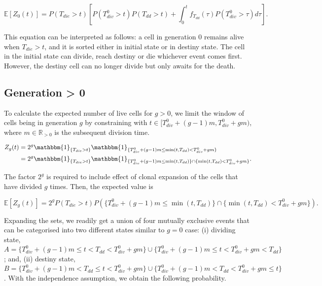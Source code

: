 \documentclass[11pt, a4paper]{article}
\begin{document}
\begin{linenomath*}
    \begin{equation}
        \label{eq:final_gen0}
        \mathbb{E}[Z_0(t)] = P(T_{die} > t)\left[P(T_{div}^0 > t)P(T_{dd} > t)  + \int_0^t f_{T_{dd}}(\tau) P(T_{div}^0 > \tau)d\tau\right].
    \end{equation}
\end{linenomath*}
This equation can be interpreted as follows: a cell in generation 0 remains alive when $T_{die} > t$, and it is sorted either in initial state or in destiny state. The cell in the initial state can divide, reach destiny or die whichever event comes first. However, the destiny cell can no longer divide but only awaits for the death.

\nolinenumbers
\subsection{Generation > 0}
\linenumbers
To calculate the expected number of live cells for $g>0$, we limit the window of cells being in generation $g$ by constraining with $t \in [T_{div}^0 + (g-1)m, T_{div}^0 + gm)$, where $m \in \mathbb{R}_{>0}$ is the subsequent division time.
\begin{linenomath*}
    \begin{align*}
        Z_g(t) & = 2^g \mathbbm{1}_{\{T_{die} > t\}} \mathbbm{1}_{\{T_{div}^0 + (g-1)m \leq \min(t, T_{dd}) < T_{div}^0 + gm\}} \\
        & = 2^g \mathbbm{1}_{\{T_{die} > t\}} \mathbbm{1}_{\{T_{div}^0 + (g-1)m \leq \min(t, T_{dd})\} \cap \{\min(t, T_{dd}) < T_{div}^0 + gm\}}.
    \end{align*}
\end{linenomath*}
The factor $2^g$ is required to include effect of clonal expansion of the cells that have divided $g$ times. Then, the expected value is
\begin{linenomath*}
    \begin{equation}
        \label{eq:primitive_gen_gr0}
        \mathbb{E}[Z_g(t)] = 2^g P(T_{die} > t)P(\{T_{div}^0 + (g-1)m \leq \min(t, T_{dd})\} \cap \{\min(t,T_{dd}) < T_{div}^0 + gm\}).
    \end{equation}
\end{linenomath*}
Expanding the sets, we readily get a union of four mutually exclusive events that can be categorised into two different states similar to $g=0$ case: (i) dividing state, $A = \{T_{div}^0 + (g-1)m \leq t < T_{dd} < T_{div}^0 + gm\} \cup \{T_{div}^0 + (g-1)m \leq t < T_{div}^0 + gm < T_{dd}\}$; and, (ii) destiny state, $B = \{T_{div}^0 + (g-1)m < T_{dd} \leq t < T_{div}^0 + gm\} \cup \{T_{div}^0 + (g-1)m < T_{dd} < T_{div}^0 + gm \leq t\}$. With the independence assumption, we obtain the following probability.
\end{document}
